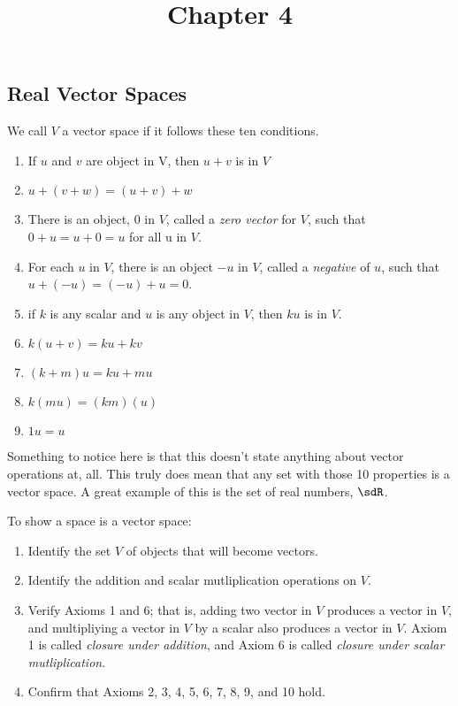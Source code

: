 \documentclass{article}
\title{Chapter 4}
\begin{document}
\maketitle
\pagebreak

\subsection{Real Vector Spaces}

\bdefn
We call $V$ a vector space if it follows these ten conditions.

\begin{enumerate}
    \item If $u$ and $v$ are object in V, then $u + v$ is in $V$ 
    \item $u + (v + w) = (u+v)+w$ 
    \item There is an object, $0$ in $V$, called a \textit{zero vector} for $V$, such that $0+u=u+0=u$ for all u in $V$.
    \item For each $u$ in $V$, there is an object $-u$ in $V$, called a \textit{negative} of $u$, such that $u + (-u)=(-u)+u=0$. 
    \item if $k$ is any scalar and $u$ is any object in $V$, then $ku$ is in $V$. 
    \item $k(u+v)=ku+kv$ 
    \item $(k + m)u = ku + mu$
    \item $k(mu)=(km)(u)$ 
    \item $1u = u$
\end{enumerate}


\brmku
Something to notice here is that this doesn't state anything about vector operations at, all. This truly does mean that any set with those 10 properties is a vector space. A great example of this is the set of real numbers, $\sdR$.
\ermku

To show a space is a vector space:

\begin{enumerate}
    \item Identify the set $V$ of objects that will become vectors. 
    \item Identify the addition and scalar mutliplication operations on $V$. 
    \item Verify Axioms 1 and 6; that is, adding two vector in $V$ produces a vector in $V$, and multipliying a vector in $V$ by a scalar also produces a vector in $V$. Axiom 1 is called \textit{closure under addition}, and Axiom 6 is called \textit{closure under scalar mutliplication}. 
    \item Confirm that Axioms 2, 3, 4, 5, 6, 7, 8, 9, and 10 hold.
\end{enumerate}
\end{document}
